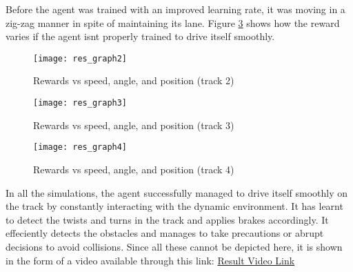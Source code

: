 Before the agent was trained with an improved learning rate, it was moving in a zig-zag manner in spite of maintaining its lane. Figure \ref{fig:res_graph4} shows how the reward varies if the agent isnt properly trained to drive itself smoothly. 

\pagebreak
\newpage


\begin{figure}[h]
	\centering
	\texttt{[image: res\_graph2]}
	\caption{Rewards vs speed, angle, and position (track 2)}
	\label{fig:res_graph2}
\end{figure}


\begin{figure}[h]
	\centering
	\texttt{[image: res\_graph3]}
	\caption{Rewards vs speed, angle, and position (track 3)}
	\label{fig:res_graph3}
\end{figure}

\pagebreak
\newpage


\begin{figure}[h]
	\centering
	\texttt{[image: res\_graph4]}
	\caption{Rewards vs speed, angle, and position (track 4)}
	\label{fig:res_graph4}
\end{figure}


In all the simulations, the agent successfully managed to drive itself smoothly on the track by constantly interacting with the dynamic environment. It has learnt to detect the twists and turns in the track and applies brakes accordingly. It effeciently detects the obstacles and manages to take precautions or abrupt decisions to avoid collisions. Since all these cannot be depicted here, it is shown in the form of a video available through this link: \href{https://tinyurl.com/jpmrxsyx}{Result Video Link}




